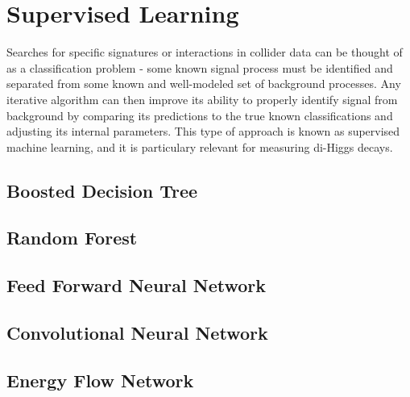 \section{Supervised Learning}
\label{sec:supervised}
Searches for specific signatures or interactions in collider data can be thought of as a classification problem - some known signal process must be identified and separated from some known and well-modeled set of background processes. Any iterative algorithm can then improve its ability to properly identify signal from background by comparing its predictions to the true known classifications and adjusting its internal parameters. This type of approach is known as supervised machine learning, and it is particulary relevant for measuring di-Higgs decays. 

\subsection{Boosted Decision Tree}


\subsection{Random Forest}


\subsection{Feed Forward Neural Network}


\subsection{Convolutional Neural Network}



%

\subsection{Energy Flow Network}

